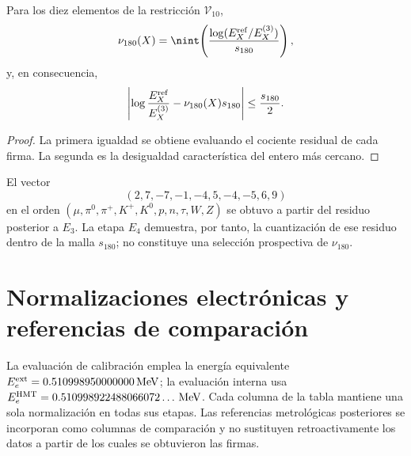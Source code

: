 \begin{theorem}
Para los diez elementos de la restricción \(\mathcal V_{10}\),
\[
 \nu_{180}(X)=\nint\!\left(
 \frac{\log(E_X^{\rm ref}/E_X^{(3)})}{s_{180}}
 \right),
\]
y, en consecuencia,
\[
 \left|\log\frac{E_X^{\rm ref}}{E_X^{(3)}}
 -\nu_{180}(X)s_{180}\right|\leq\frac{s_{180}}2.
\]
\end{theorem}
\begin{proof}
La primera igualdad se obtiene evaluando el cociente residual de cada firma.
La segunda es la desigualdad característica del entero más cercano.
\end{proof}

El vector
\[
 (2,7,-7,-1,-4,5,-4,-5,6,9)
\]
en el orden
\((\mu,\pi^0,\pi^+,K^+,K^0,p,n,\tau,W,Z)\) se obtuvo a partir del residuo
posterior a \(E_3\). La etapa \(E_4\) demuestra, por tanto, la cuantización de
ese residuo dentro de la malla \(s_{180}\); no constituye una selección
prospectiva de \(\nu_{180}\).

\section{Normalizaciones electrónicas y referencias de comparación}

La evaluación de calibración emplea la energía equivalente
\(E_e^{\rm ext}=0.510998950000000\,{\rm MeV}\); la evaluación interna usa
\(E_e^{\rm HMT}=0.510998922488066072\ldots\,{\rm MeV}\). Cada columna de la
tabla mantiene una sola normalización en todas sus etapas. Las referencias
metrológicas posteriores se incorporan como columnas de comparación y no
sustituyen retroactivamente los datos a partir de los cuales se obtuvieron las
firmas.
